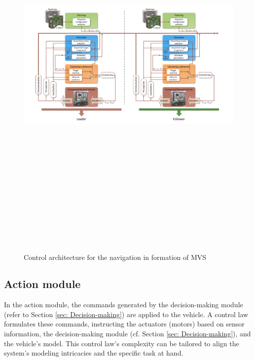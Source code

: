 \begin{figure}[!h]
        \centering 
        \includegraphics[width=13cm,height=20cm,keepaspectratio]{chapters/Chapitre_3/Figures/Archi_vilca}
        \caption{Control architecture for the navigation in formation of MVS \cite{ventura2015safe}}
        \label{fig:Archi_Vilca}
        \end{figure}


      \subsection{Action module} \label{sec: Action} In the action module, the commands generated by the decision-making module (refer to Section \ref{sec: Decision-making}) are applied to the vehicle. A control law formulates these commands, instructing the actuators (motors) based on sensor information, the decision-making module (cf. Section \ref{sec: Decision-making}), and the vehicle's model. This control law's complexity can be tailored to align the system's modeling intricacies and the specific task at hand. 

